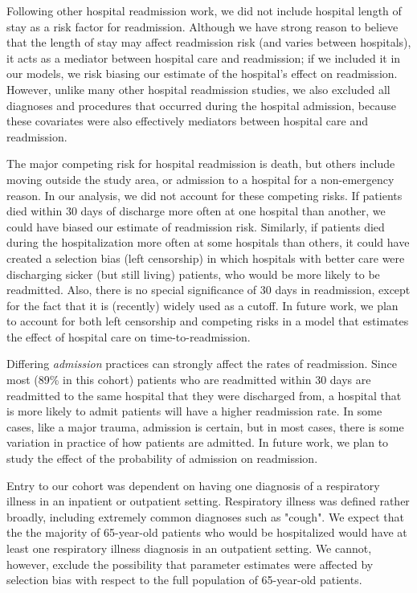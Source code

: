 \documentclass[]{article}\usepackage[]{graphicx}\usepackage[]{color}
\begin{document}
Following other hospital readmission work, we did not include hospital length of stay as a risk factor for readmission. Although we have strong reason to believe that the length of stay may affect readmission risk (and varies between hospitals), it acts as a mediator between hospital care and readmission; if we included it in our models, we risk biasing our estimate of the hospital's effect on readmission. However, unlike many other hospital readmission studies, we also excluded all diagnoses and procedures that occurred during the hospital admission, because these covariates were also effectively mediators between hospital care and readmission. 

The major competing risk for hospital readmission is death, but others include moving outside the study area, or admission to a hospital for a non-emergency reason. In our analysis, we did not account for these competing risks. If patients died within 30 days of discharge more often at one hospital than another, we could have biased our estimate of readmission risk. Similarly, if patients died during the hospitalization more often at some hospitals than others, it could have created a selection bias (left censorship) in which hospitals with better care were discharging sicker (but still living) patients, who would be more likely to be readmitted. Also, there is no special significance of 30 days in readmission, except for the fact that it is (recently) widely used as a cutoff. In future work, we plan to account for both left censorship and competing risks in a model that estimates the effect of hospital care on time-to-readmission.

Differing \emph{admission} practices can strongly affect the rates of readmission. Since most  (89\% in this cohort) patients who are readmitted within 30 days are readmitted to the same hospital that they were discharged from, a hospital that is more likely to admit patients will have a higher readmission rate. In some cases, like a major trauma, admission is certain, but in most cases, there is some variation in practice of how patients are admitted. In future work, we plan to study the effect of the probability of admission on readmission.

Entry to our cohort was dependent on having one diagnosis of a respiratory illness in an inpatient or outpatient setting. Respiratory illness was defined rather broadly, including extremely common diagnoses such as "cough". We expect that the the majority of 65-year-old patients who would be hospitalized would have at least one respiratory illness diagnosis in an outpatient setting. We cannot, however, exclude the possibility that parameter estimates were affected by selection bias with respect to the full population of 65-year-old patients.
\end{document}
